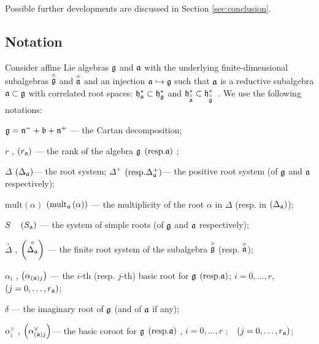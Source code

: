 \documentclass[12pt]{article}
\theoremstyle{definition}
\begin{document}
Possible further developments are discussed in Section \ref{sec:conclusion}.

\subsection{Notation}

\label{sec:notation}

Consider affine Lie algebras $\frak{g}$ and $\frak{a}$ with the underlying
finite-dimensional subalgebras $\stackrel{\circ }{\frak{g}}$ and $\stackrel{%
\circ }{\frak{a}}$ and an injection $\frak{a}\hookrightarrow \frak{g}$ such
that $\frak{a}$ is a reductive subalgebra $\frak{a\subset g}$ with
correlated root spaces: $\frak{h}_{\frak{a}}^{\ast }\subset \frak{h}_{\frak{g%
}}^{\ast }$ and $\frak{h}_{\stackrel{\circ }{\frak{a}}}^{\ast }\subset \frak{%
h}_{\stackrel{\circ }{\frak{g}}}^{\ast }$\ . We use the following notations:

$\frak{g=n}^{-}+\frak{b}+\frak{n}^{+}$ --- the Cartan decomposition;

$r$ , $\left( r_{\frak{a}}\right) $ --- the rank of the algebra $\frak{g}$ $%
\left( \mathrm{{resp. }\frak{a}}\right) $ ;

$\Delta $ $\left( \Delta _{\frak{a}}\right) $--- the root system; $\Delta
^{+} $ $\left( \mathrm{{resp. }\Delta _{\frak{a}}^{+}}\right) $--- the
positive root system (of $\frak{g}$ and $\frak{a}$ respectively);

$\mathrm{mult}\left( \alpha \right) $ $\left( \mathrm{mult}_{\frak{a}}\left(
\alpha \right) \right) $ --- the multiplicity of the root $\alpha$ in $%
\Delta $ (resp. in $\left( \Delta _{\frak{a}}\right) $);

$S\quad \left( S_{\frak{a}}\right) $ --- the system of simple roots (of $%
\frak{g}$ and $\frak{a}$ respectively);

$\stackrel{\circ }{\Delta }$ , $\left( \stackrel{\circ }{\Delta _{\frak{a}}}%
\right) $ --- the finite root system of the subalgebra $\stackrel{\circ }{%
\frak{g}}$ (resp. $\stackrel{\circ }{\frak{a}}$);

$\alpha _{i}$ , $\left( \alpha _{\left( \frak{a}\right) j}\right) $ --- the $%
i$-th (resp. $j$-th) basic root for $\frak{g}$ $\left( \mathrm{{resp.}\frak{a%
}}\right) $; $i=0,\ldots ,r$,\ \ $\left( j=0,\ldots ,r_{\frak{a}}\right) $;

$\delta $ --- the imaginary root of $\frak{g}$ (and of $\frak{a}$ if any);

$\alpha _{i}^{\vee }$ , $\left( \alpha _{\left( \frak{a}\right) j}^{\vee
}\right) $--- the basic coroot for $\frak{g}$ $\left( \mathrm{{resp.}\frak{a}%
}\right) $ , $i=0,\ldots ,r$ ;\ \ $\left( j=0,\ldots ,r_{\frak{a}}\right) $;
\end{document}
